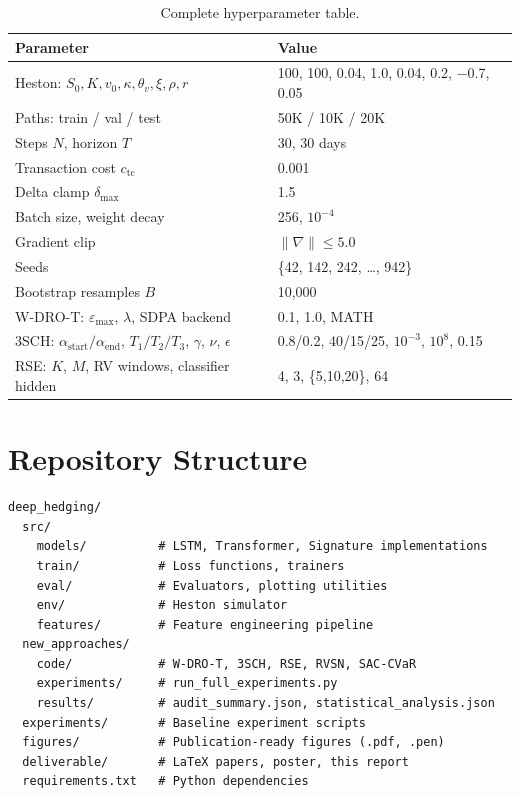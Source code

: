 \begin{table}[H]
\centering\small
\caption{Complete hyperparameter table.}
\begin{tabular}{@{}ll@{}}
\toprule
\textbf{Parameter} & \textbf{Value} \\\midrule
Heston: $S_0, K, v_0, \kappa, \theta_v, \xi, \rho, r$ & 100, 100, 0.04, 1.0, 0.04, 0.2, $-$0.7, 0.05 \\
Paths: train / val / test & 50K / 10K / 20K \\
Steps $N$, horizon $T$ & 30, 30 days \\
Transaction cost $c_{\mathrm{tc}}$ & 0.001 \\
Delta clamp $\delta_{\max}$ & 1.5 \\
Batch size, weight decay & 256, $10^{-4}$ \\
Gradient clip & $\|\nabla\| \leq 5.0$ \\
Seeds & \{42, 142, 242, \ldots, 942\} \\
Bootstrap resamples $B$ & 10,000 \\
W-DRO-T: $\varepsilon_{\max}$, $\lambda$, SDPA backend & 0.1, 1.0, MATH \\
3SCH: $\alpha_{\text{start}}/\alpha_{\text{end}}$, $T_1/T_2/T_3$, $\gamma$, $\nu$, $\epsilon$ & 0.8/0.2, 40/15/25, $10^{-3}$, $10^8$, 0.15 \\
RSE: $K$, $M$, RV windows, classifier hidden & 4, 3, \{5,10,20\}, 64 \\
\bottomrule
\end{tabular}
\end{table}

\section{Repository Structure}
\label{app:repo}

\begin{verbatim}
deep_hedging/
  src/
    models/          # LSTM, Transformer, Signature implementations
    train/           # Loss functions, trainers
    eval/            # Evaluators, plotting utilities
    env/             # Heston simulator
    features/        # Feature engineering pipeline
  new_approaches/
    code/            # W-DRO-T, 3SCH, RSE, RVSN, SAC-CVaR
    experiments/     # run_full_experiments.py
    results/         # audit_summary.json, statistical_analysis.json
  experiments/       # Baseline experiment scripts
  figures/           # Publication-ready figures (.pdf, .pen)
  deliverable/       # LaTeX papers, poster, this report
  requirements.txt   # Python dependencies
\end{verbatim}

